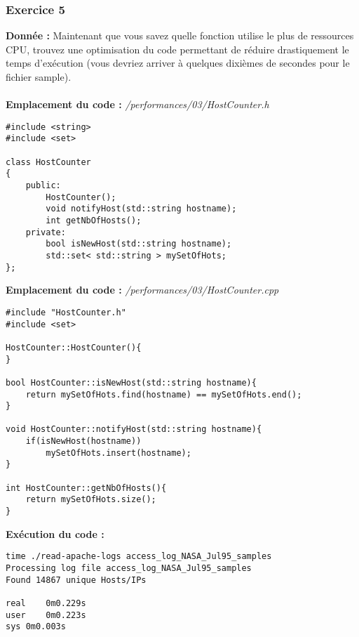 \subsubsection{Exercice 5}
\textbf{Donnée : } Maintenant	que	vous	savez	quelle	fonction	utilise	le	plus	de	ressources	CPU,	trouvez	une	optimisation	
du	code	permettant	de	réduire	drastiquement	le	temps	d'exécution	(vous	devriez	arriver	à	quelques	
dixièmes	de	secondes	pour	le	fichier	sample).\\\\
\textbf{Emplacement du code : } \textit{/performances/03/HostCounter.h}
\begin{lstlisting}
#include <string>
#include <set>

class HostCounter
{
    public:
        HostCounter();
        void notifyHost(std::string hostname);
        int getNbOfHosts();
    private:
        bool isNewHost(std::string hostname);
        std::set< std::string > mySetOfHots;
};
\end{lstlisting}
\textbf{Emplacement du code : } \textit{/performances/03/HostCounter.cpp}
\begin{lstlisting}
#include "HostCounter.h"
#include <set>

HostCounter::HostCounter(){
}

bool HostCounter::isNewHost(std::string hostname){
    return mySetOfHots.find(hostname) == mySetOfHots.end();
}

void HostCounter::notifyHost(std::string hostname){
    if(isNewHost(hostname))
        mySetOfHots.insert(hostname);
}

int HostCounter::getNbOfHosts(){
    return mySetOfHots.size();
}
\end{lstlisting}

\textbf{Exécution du code : } 
\begin{lstlisting}
time ./read-apache-logs access_log_NASA_Jul95_samples 
Processing log file access_log_NASA_Jul95_samples
Found 14867 unique Hosts/IPs

real	0m0.229s
user	0m0.223s
sys	0m0.003s
\end{lstlisting}

